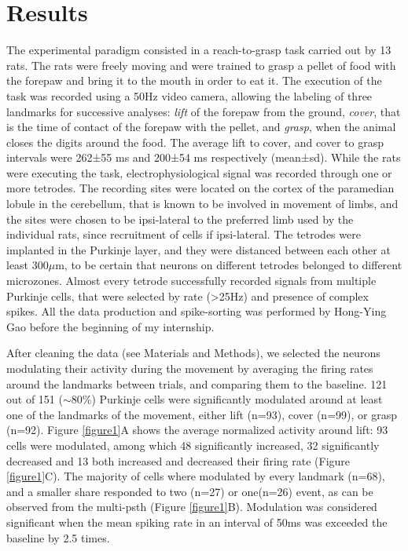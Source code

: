 \section{Results}

The experimental paradigm consisted in a reach-to-grasp task carried out by 13 rats. The rats were freely moving and were trained to grasp a pellet of food with the forepaw and bring it to the mouth in order to eat it. The execution of the task was recorded using a 50Hz video camera, allowing the labeling of three landmarks for successive analyses: \emph{lift} of the forepaw from the ground, \emph{cover}, that is the time of contact of the forepaw with the pellet, and \emph{grasp}, when the animal closes the digits around the food. 
The average lift to cover, and cover to grasp intervals were 262±55 ms and 200±54 ms respectively (mean±sd). While the rats were executing the task, electrophysiological signal was recorded through one or more tetrodes. The recording sites were located on the cortex of the paramedian lobule in the cerebellum, that is known to be involved in movement of limbs, and the sites were chosen to be ipsi-lateral to the preferred limb used by the individual rats, since recruitment  of cells if ipsi-lateral. The tetrodes were implanted in the Purkinje layer, and they were distanced between each other at least 300$\mu$m, to be certain that neurons on different tetrodes belonged to different microzones. Almost every tetrode successfully recorded signals from multiple Purkinje cells, that were selected by rate (>25Hz) and presence of complex spikes. 
All the data production and spike-sorting was performed by Hong-Ying Gao before the beginning of my internship.

After cleaning the data (see Materials and Methods), we selected the neurons modulating their activity during the movement by averaging the firing rates around the landmarks between trials, and comparing them to the baseline. 121 out of 151 ($\sim$80\%) Purkinje cells were significantly modulated around at least one of the landmarks of the movement, either lift (n=93), cover (n=99), or grasp (n=92). Figure \ref{figure1}A shows the average normalized activity around lift: 93 cells were modulated, among which 48 significantly increased, 32 significantly decreased and 13 both increased and decreased their firing rate (Figure \ref{figure1}C). The majority of cells where modulated by every landmark (n=68), and a smaller share responded to two (n=27) or one(n=26) event, as can be observed from the multi-psth (Figure \ref{figure1}B). Modulation was considered significant when the mean spiking rate in an interval of 50ms was exceeded the baseline by 2.5 times.

